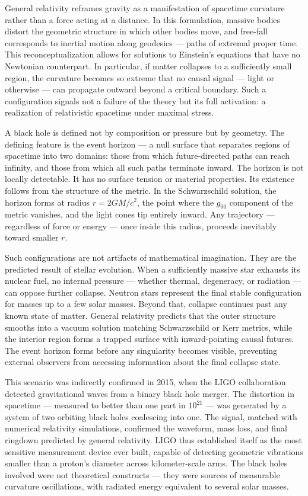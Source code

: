 
General relativity reframes gravity as a manifestation of spacetime curvature rather than a force acting at a distance. In this formulation, massive bodies distort the geometric structure in which other bodies move, and free-fall corresponds to inertial motion along geodesics — paths of extremal proper time. This reconceptualization allows for solutions to Einstein’s equations that have no Newtonian counterpart. In particular, if matter collapses to a sufficiently small region, the curvature becomes so extreme that no causal signal — light or otherwise — can propagate outward beyond a critical boundary. Such a configuration signals not a failure of the theory but its full activation: a realization of relativistic spacetime under maximal stress.


A black hole is defined not by composition or pressure but by geometry. The defining feature is the event horizon — a null surface that separates regions of spacetime into two domains: those from which future-directed paths can reach infinity, and those from which all such paths terminate inward. The horizon is not locally detectable. It has no surface tension or material properties. Its existence follows from the structure of the metric. In the Schwarzschild solution, the horizon forms at radius $r = 2GM/c^2$, the point where the $g_{00}$ component of the metric vanishes, and the light cones tip entirely inward. Any trajectory — regardless of force or energy — once inside this radius, proceeds inevitably toward smaller $r$.


Such configurations are not artifacts of mathematical imagination. They are the predicted result of stellar evolution. When a sufficiently massive star exhausts its nuclear fuel, no internal pressure — whether thermal, degeneracy, or radiation — can oppose further collapse. Neutron stars represent the final stable configuration for masses up to a few solar masses. Beyond that, collapse continues past any known state of matter. General relativity predicts that the outer structure smooths into a vacuum solution matching Schwarzschild or Kerr metrics, while the interior region forms a trapped surface with inward-pointing causal futures. The event horizon forms before any singularity becomes visible, preventing external observers from accessing information about the final collapse state.


This scenario was indirectly confirmed in 2015, when the LIGO collaboration detected gravitational waves from a binary black hole merger. The distortion in spacetime — measured to better than one part in $10^{21}$ — was generated by a system of two orbiting black holes coalescing into one. The signal, matched with numerical relativity simulations, confirmed the waveform, mass loss, and final ringdown predicted by general relativity. LIGO thus established itself as the most sensitive measurement device ever built, capable of detecting geometric vibrations smaller than a proton’s diameter across kilometer-scale arms. The black holes involved were not theoretical constructs — they were sources of measurable curvature oscillations, with radiated energy equivalent to several solar masses.



